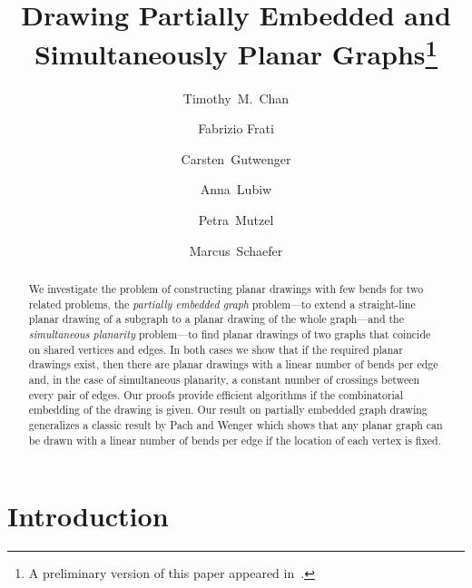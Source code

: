 \documentclass{llncs}
\begin{document}
\title{Drawing Partially Embedded and\\ Simultaneously Planar Graphs\thanks{A preliminary version of this paper appeared in~\cite{cfglms-dpespg-14}.}}


\author{ Timothy~M.~Chan
\and Fabrizio Frati
    \and Carsten~Gutwenger
    \and Anna~Lubiw
    \and Petra~Mutzel
    \and Marcus~Schaefer
}




\maketitle


\begin{abstract}
We investigate the problem of constructing planar drawings with few bends for two related problems, the \emph{partially embedded graph} problem---to extend a straight-line planar drawing of a subgraph to a planar drawing of the whole graph---and the \emph{simultaneous planarity} problem---to find planar drawings of two graphs that coincide on shared vertices and edges. In both cases we show that if the required planar drawings exist, then there are planar drawings with a linear number of bends per edge and, in the case of simultaneous planarity, a constant number of crossings between every pair of edges.  Our proofs provide efficient algorithms if the combinatorial embedding of the drawing is given. Our result on partially embedded graph drawing  generalizes a classic result by Pach and Wenger which shows that any planar graph can be drawn with a linear number of bends per edge if the location of each vertex is fixed.
 \end{abstract}

\section{Introduction}
\label{sec:intro}
\end{document}
